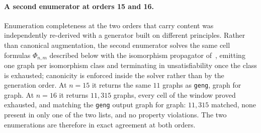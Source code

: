 \documentclass[11pt]{article}
\theoremstyle{definition}
\begin{document}
\paragraph{A second enumerator at orders 15 and 16.} Enumeration completeness at
the two orders that carry content was independently re-derived with a generator
built on different principles. Rather than canonical augmentation, the second
enumerator solves the same cell formulas $\Phi_{n,m}$ described below with the
isomorphism propagator of~\cite{KirchwegerSzeider2021}, emitting one graph per
isomorphism class and terminating in unsatisfiability once the class is
exhausted; canonicity is enforced inside the solver rather than by the generation
order. At $n = 15$ it returns the same $11$ graphs as \texttt{geng}, graph for
graph. At $n = 16$ it returns $11{,}315$ graphs, every cell of the window proved
exhausted, and matching the \texttt{geng} output graph for graph: $11{,}315$
matched, none present in only one of the two lists, and no property violations.
The two enumerations are therefore in exact agreement at both orders.
\end{document}
